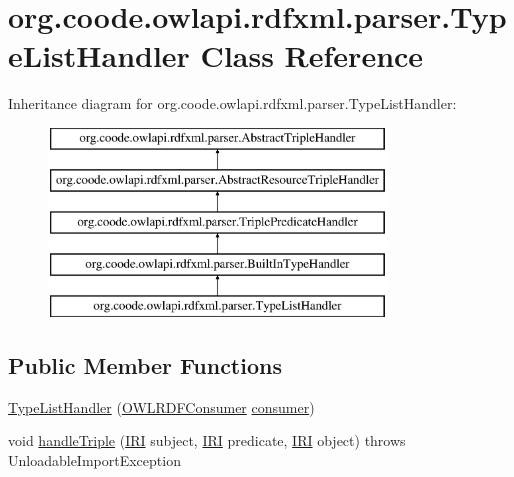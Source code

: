 \hypertarget{classorg_1_1coode_1_1owlapi_1_1rdfxml_1_1parser_1_1_type_list_handler}{\section{org.\-coode.\-owlapi.\-rdfxml.\-parser.\-Type\-List\-Handler Class Reference}
\label{classorg_1_1coode_1_1owlapi_1_1rdfxml_1_1parser_1_1_type_list_handler}
}
Inheritance diagram for org.\-coode.\-owlapi.\-rdfxml.\-parser.\-Type\-List\-Handler\-:\begin{figure}[H]
\begin{center}
\leavevmode
\includegraphics[height=5.000000cm]{classorg_1_1coode_1_1owlapi_1_1rdfxml_1_1parser_1_1_type_list_handler}
\end{center}
\end{figure}
\subsection*{Public Member Functions}
\begin{DoxyCompactItemize}
\item 
\hyperlink{classorg_1_1coode_1_1owlapi_1_1rdfxml_1_1parser_1_1_type_list_handler_aacf1f183096c423c548131da62a6a2dc}{Type\-List\-Handler} (\hyperlink{classorg_1_1coode_1_1owlapi_1_1rdfxml_1_1parser_1_1_o_w_l_r_d_f_consumer}{O\-W\-L\-R\-D\-F\-Consumer} \hyperlink{classorg_1_1coode_1_1owlapi_1_1rdfxml_1_1parser_1_1_abstract_triple_handler_a4ccf4d898ff01eb1cadfa04b23d54e9c}{consumer})
\item 
void \hyperlink{classorg_1_1coode_1_1owlapi_1_1rdfxml_1_1parser_1_1_type_list_handler_adb5ce40dafa1b682b6088962d57d5025}{handle\-Triple} (\hyperlink{classorg_1_1semanticweb_1_1owlapi_1_1model_1_1_i_r_i}{I\-R\-I} subject, \hyperlink{classorg_1_1semanticweb_1_1owlapi_1_1model_1_1_i_r_i}{I\-R\-I} predicate, \hyperlink{classorg_1_1semanticweb_1_1owlapi_1_1model_1_1_i_r_i}{I\-R\-I} object)  throws Unloadable\-Import\-Exception 
\end{DoxyCompactItemize}
